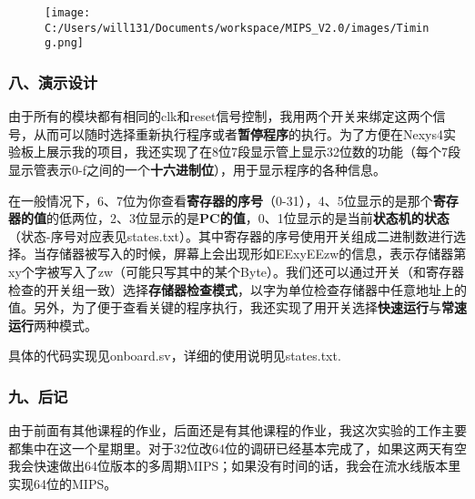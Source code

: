 \documentclass[]{article}
\begin{document}
\begin{figure}
\centering
\texttt{[image: C:/Users/will131/Documents/workspace/MIPS\_V2.0/images/Timing.png]}
\caption{}
\end{figure}

\subsubsection{八、演示设计}\label{header-n2020}

由于所有的模块都有相同的clk和reset信号控制，我用两个开关来绑定这两个信号，从而可以随时选择重新执行程序或者\textbf{暂停程序}的执行。为了方便在Nexys4实验板上展示我的项目，我还实现了在8位7段显示管上显示32位数的功能（每个7段显示管表示0-f之间的一个\textbf{十六进制位}），用于显示程序的各种信息。

在一般情况下，6、7位为你查看\textbf{寄存器的序号}（0-31），4、5位显示的是那个\textbf{寄存器的值}的低两位，2、3位显示的是\textbf{PC的值}，0、1位显示的是当前\textbf{状态机的状态}（状态-序号对应表见states.txt）。其中寄存器的序号使用开关组成二进制数进行选择。当存储器被写入的时候，屏幕上会出现形如EExyEEzw的信息，表示存储器第xy个字被写入了zw（可能只写其中的某个Byte）。我们还可以通过开关（和寄存器检查的开关组一致）选择\textbf{存储器检查模式}，以字为单位检查存储器中任意地址上的值。另外，为了便于查看关键的程序执行，我还实现了用开关选择\textbf{快速运行}与\textbf{常速运行}两种模式。

具体的代码实现见onboard.sv，详细的使用说明见states.txt.

\subsubsection{九、后记}\label{header-n2027}

由于前面有其他课程的作业，后面还是有其他课程的作业，我这次实验的工作主要都集中在这一个星期里。对于32位改64位的调研已经基本完成了，如果这两天有空我会快速做出64位版本的多周期MIPS；如果没有时间的话，我会在流水线版本里实现64位的MIPS。
\end{document}
